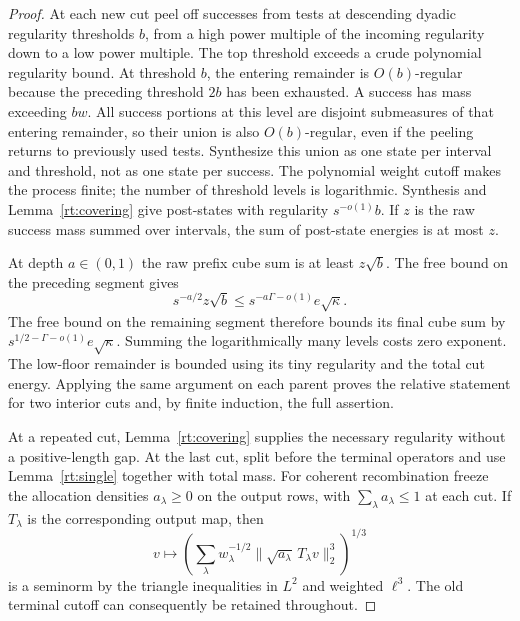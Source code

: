\begin{proof}
At each new cut peel off successes from tests at descending dyadic
regularity thresholds $b$, from a high power multiple of the incoming
regularity down to a low power multiple.  The top threshold exceeds a
crude polynomial regularity bound.  At threshold $b$, the entering
remainder is $O(b)$-regular because the preceding threshold $2b$ has
been exhausted.  A success has mass exceeding $bw$.  All success
portions at this level are disjoint submeasures of that entering
remainder, so their union is also $O(b)$-regular, even if the peeling
returns to previously used tests.  Synthesize this union as one state
per interval and threshold, not as one state per success.  The polynomial
weight cutoff makes the process finite; the number of threshold levels
is logarithmic.  Synthesis and Lemma~\ref{rt:covering} give post-states
with regularity $s^{-o(1)}b$.  If $z$ is the raw success mass summed over
intervals, the sum of post-state energies is at most $z$.

At depth $a\in(0,1)$ the raw prefix cube sum is at least $z\sqrt b$.
The free bound on the preceding segment gives
\[
 s^{-a/2}z\sqrt b\le s^{-a\Gamma-o(1)}e\sqrt\kappa.
\]
The free bound on the remaining segment therefore bounds its final cube
sum by $s^{1/2-\Gamma-o(1)}e\sqrt\kappa$.  Summing the logarithmically
many levels costs zero exponent.  The low-floor remainder is bounded
using its tiny regularity and the total cut energy.  Applying the same
argument on each parent proves the relative statement for two interior
cuts and, by finite induction, the full assertion.

At a repeated cut, Lemma~\ref{rt:covering} supplies the necessary
regularity without a positive-length gap.  At the last cut, split before
the terminal operators and use Lemma~\ref{rt:single} together with total
mass.  For coherent recombination freeze the allocation densities
$a_\lambda\ge0$ on the output rows, with $\sum_\lambda a_\lambda\le1$
at each cut.  If $T_\lambda$ is the corresponding output map, then
\[
 v\longmapsto
 \left(\sum_\lambda w_\lambda^{-1/2}
       \|\sqrt{a_\lambda}\,T_\lambda v\|_2^3\right)^{1/3}
\]
is a seminorm by the triangle inequalities in $L^2$ and weighted
$\ell^3$.
The old terminal cutoff can consequently be retained throughout.
\end{proof}

